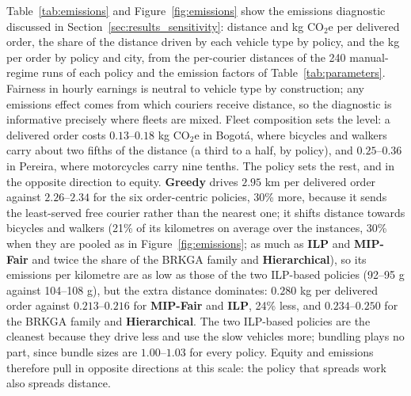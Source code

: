 \documentclass[a4paper,11pt,review,3p,authoryear]{elsarticle}
\begin{document}
Table~\ref{tab:emissions} and Figure~\ref{fig:emissions} show the emissions diagnostic discussed in Section~\ref{sec:results_sensitivity}: distance and kg CO$_2$e per delivered order, the share of the distance driven by each vehicle type by policy, and the kg per order by policy and city, from the per-courier distances of the 240 manual-regime runs of each policy and the emission factors of Table~\ref{tab:parameters}. Fairness in hourly earnings is neutral to vehicle type by construction; any emissions effect comes from which couriers receive distance, so the diagnostic is informative precisely where fleets are mixed. Fleet composition sets the level: a delivered order costs $0.13$--$0.18$ kg CO$_2$e in Bogot\'a, where bicycles and walkers carry about two fifths of the distance (a third to a half, by policy), and $0.25$--$0.36$ in Pereira, where motorcycles carry nine tenths. The policy sets the rest, and in the opposite direction to equity. \textbf{Greedy} drives $2.95$ km per delivered order against $2.26$--$2.34$ for the six order-centric policies, 30\% more, because it sends the least-served free courier rather than the nearest one; it shifts distance towards bicycles and walkers (21\% of its kilometres on average over the instances, 30\% when they are pooled as in Figure~\ref{fig:emissions}; as much as \textbf{ILP} and \textbf{MIP-Fair} and twice the share of the BRKGA family and \textbf{Hierarchical}), so its emissions per kilometre are as low as those of the two ILP-based policies (92--95 g against 104--108 g), but the extra distance dominates: $0.280$ kg per delivered order against $0.213$--$0.216$ for \textbf{MIP-Fair} and \textbf{ILP}, 24\% less, and $0.234$--$0.250$ for the BRKGA family and \textbf{Hierarchical}. The two ILP-based policies are the cleanest because they drive less and use the slow vehicles more; bundling plays no part, since bundle sizes are $1.00$--$1.03$ for every policy. Equity and emissions therefore pull in opposite directions at this scale: the policy that spreads work also spreads distance.
\end{document}
